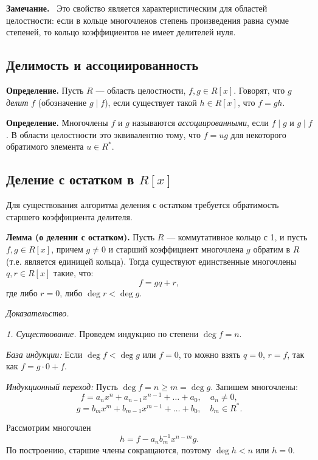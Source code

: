 \documentclass[a4paper,12pt]{article}
\newcommand{\myremark}{\textbf{Замечание.}\ }
\theoremstyle{definition}
\theoremstyle{plain}
\theoremstyle{remark}
\begin{document}
	\myremark
	Это свойство является характеристическим для областей целостности: если в кольце многочленов степень произведения равна сумме степеней, то кольцо коэффициентов не имеет делителей нуля.
	
	\subsection{Делимость и ассоциированность}
	
	\noindent \textbf{Определение.} Пусть \( R \) — область целостности, \( f, g \in R[x] \). Говорят, что \( g \) \textit{делит} \( f \) (обозначение \( g \mid f \)), если существует такой \( h \in R[x] \), что \( f = gh \).
	
	\noindent \textbf{Определение.} Многочлены \( f \) и \( g \) называются \textit{ассоциированными}, если \( f \mid g \) и \( g \mid f \). В области целостности это эквивалентно тому, что \( f = ug \) для некоторого обратимого элемента \( u \in R^* \).
	
	\subsection{Деление с остатком в \( R[x] \)}
	
	Для существования алгоритма деления с остатком требуется обратимость старшего коэффициента делителя.
	
	\medskip
	\noindent \textbf{Лемма (о делении с остатком).} 
	Пусть \( R \) — коммутативное кольцо с 1, и пусть \( f, g \in R[x] \), причем \( g \neq 0 \) и старший коэффициент многочлена \( g \) обратим в \( R \) (т.е. является единицей кольца). Тогда существуют единственные многочлены \( q, r \in R[x] \) такие, что:
	\[
	f = gq + r,
	\]
	где либо \( r = 0 \), либо \( \deg r < \deg g \).
	
	\medskip
	\textit{Доказательство.}
	
	\textit{1. Существование.} Проведем индукцию по степени \( \deg f = n \).
	
	\textit{База индукции:} Если \( \deg f < \deg g \) или \( f = 0 \), то можно взять \( q = 0 \), \( r = f \), так как \( f = g \cdot 0 + f \).
	
	\textit{Индукционный переход:} Пусть \( \deg f = n \geq m = \deg g \). Запишем многочлены:
	\[
	f = a_n x^n + a_{n-1} x^{n-1} + \dots + a_0, \quad a_n \neq 0,
	\]
	\[
	g = b_m x^m + b_{m-1} x^{m-1} + \dots + b_0, \quad b_m \in R^*.
	\]
	
	Рассмотрим многочлен
	\[
	h = f - a_n b_m^{-1} x^{n-m} g.
	\]
	По построению, старшие члены сокращаются, поэтому \( \deg h < n \) или \( h = 0 \).
	
\end{document}
